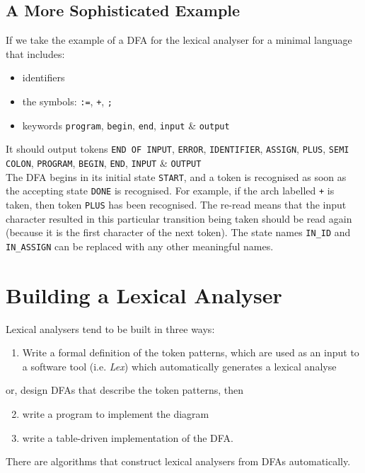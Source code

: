 \subsection{A More Sophisticated Example}
If we take the example of a DFA for the lexical analyser for a minimal language that includes:
\begin{itemize}
    \item identifiers
    \item the symbols: \verb|:=|, \verb|+|, \verb|;|
    \item keywords \verb|program|, \verb|begin|, \verb|end|, \verb|input| \& \verb|output|
\end{itemize}

It should output tokens \verb|END OF INPUT|, \verb|ERROR|, \verb|IDENTIFIER|, \verb|ASSIGN|, \verb|PLUS|, \verb|SEMI COLON|, \verb|PROGRAM|, \verb|BEGIN|, \verb|END|, \verb|INPUT| \& \verb|OUTPUT|\\


The DFA begins in its initial state \verb|START|, and a token is recognised as soon as the accepting state \verb|DONE| is recognised. For example, if the arch labelled \verb|+| is taken, then token \verb|PLUS| has been  recognised. The re-read means that the input character resulted in this particular transition being taken should be read again (because it is the first character of the next token). The state names \verb|IN_ID| and \verb|IN_ASSIGN| can be replaced with any other meaningful names. 

\section{Building a Lexical Analyser}
Lexical analysers tend to be built in three ways:
\begin{enumerate}
    \item Write a formal definition of the token patterns, which are used as an input to a software tool (i.e. \textit{Lex}) which automatically generates a lexical analyse 
\end{enumerate}
or, design DFAs that describe the token patterns, then
\begin{enumerate}
    \setcounter{enumi}{1}
    \item write a program to implement the diagram
    \item write a table-driven implementation of the DFA.
\end{enumerate}
There are algorithms that construct lexical analysers from DFAs automatically.

